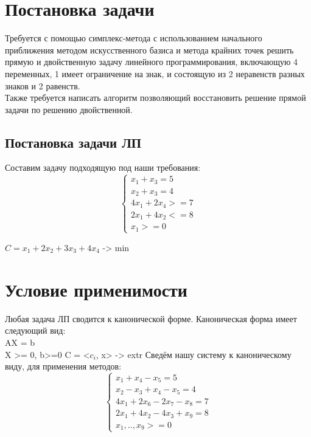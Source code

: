 \documentclass[a4]{article}
\begin{document}
	
	\section{Постановка задачи}
		Требуется с помощью симплекс-метода с использованием начального приближения методом искусственного базиса и метода крайних точек решить прямую и двойственную задачу линейного программирования, включающую 4 переменных, 1 имеет ограничение на знак, и состоящую из 2 неравенств разных знаков и 2 равенств.\\
		Также требуется написать алгоритм позволяющий восстановить решение прямой задачи по решению двойственной.\\
		\subsection{Постановка задачи ЛП}
		Составим задачу подходящую под наши требования:\\
		\begin{equation*}
			\begin{cases}
				x_1 + x_3 = 5\\
				x_2 + x_3 = 4\\
				4x_1 + 2x_4 >= 7\\
				2x_1 + 4x_2 <= 8\\
				x_1>=0
			\end{cases}
		\end{equation*}
		
		\begin{center}
			$C = x_1 + 2x_2 + 3x_3 + 4x_4$ -> min
		\end{center}
		
	\section{Условие применимости}
		Любая задача ЛП сводится к канонической форме. Каноническая форма имеет следующий вид:\\
		AX = b\\
		X >= 0, b>=0
		C = <$c_i$, x> -> extr
		Сведём нашу систему к каноническому виду, для применения методов:\\
		
		\begin{equation*}
			\begin{cases}
				x_1 + x_4 - x_5 = 5\\
				x_2 - x_3 + x_4 - x_5 = 4\\
				4x_1 + 2x_6 - 2x_7 - x_8 = 7\\
				2x_1 + 4x_2 - 4x_3 + x_9 = 8\\
				x_1, .., x_9 >=0
			\end{cases}
		\end{equation*}
		
\end{document}
